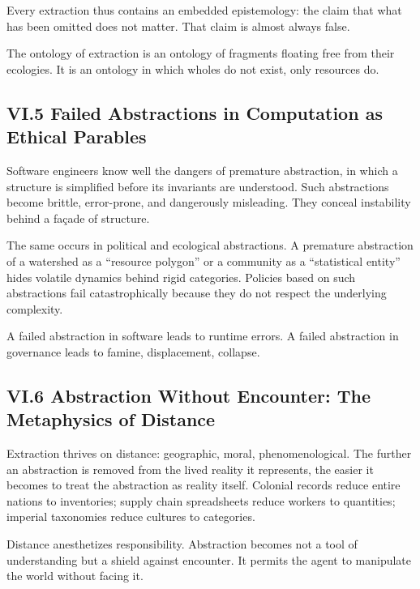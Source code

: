 \documentclass[12pt,letterpaper]{article}
\begin{document}
Every extraction thus contains an embedded epistemology: the claim that what has been omitted does not matter. That claim is almost always false.

The ontology of extraction is an ontology of fragments floating free from their ecologies. It is an ontology in which wholes do not exist, only resources do.

\subsection{VI.5 Failed Abstractions in Computation as Ethical Parables}

Software engineers know well the dangers of premature abstraction, in which a structure is simplified before its invariants are understood. Such abstractions become brittle, error-prone, and dangerously misleading. They conceal instability behind a façade of structure.

The same occurs in political and ecological abstractions. A premature abstraction of a watershed as a ``resource polygon'' or a community as a ``statistical entity'' hides volatile dynamics behind rigid categories. Policies based on such abstractions fail catastrophically because they do not respect the underlying complexity.

A failed abstraction in software leads to runtime errors. A failed abstraction in governance leads to famine, displacement, collapse.

\subsection{VI.6 Abstraction Without Encounter: The Metaphysics of Distance}

Extraction thrives on distance: geographic, moral, phenomenological. The further an abstraction is removed from the lived reality it represents, the easier it becomes to treat the abstraction as reality itself. Colonial records reduce entire nations to inventories; supply chain spreadsheets reduce workers to quantities; imperial taxonomies reduce cultures to categories.

Distance anesthetizes responsibility. Abstraction becomes not a tool of understanding but a shield against encounter. It permits the agent to manipulate the world without facing it.
\end{document}
